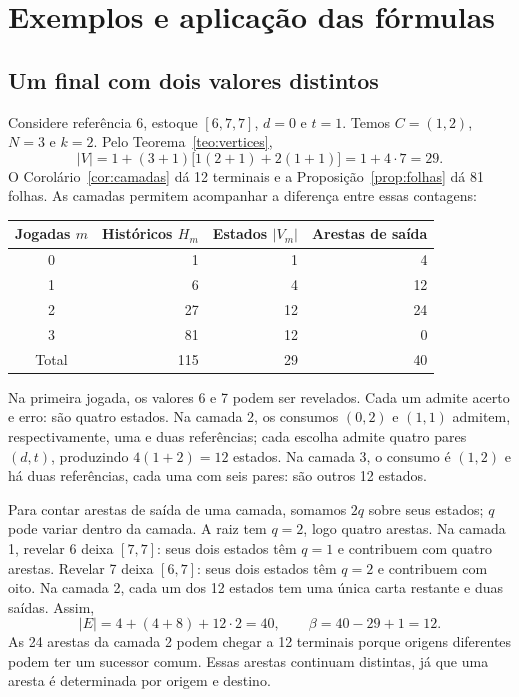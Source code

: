 \documentclass[11pt,a4paper]{article}
\theoremstyle{definition}
\newcommand{\proxpagina}{\newpage}
\begin{document}
\proxpagina
\section{Exemplos e aplicação das fórmulas}
\subsection{Um final com dois valores distintos}
Considere referência 6, estoque $[6,7,7]$, $d=0$ e $t=1$. Temos $C=(1,2)$, $N=3$ e $k=2$. Pelo Teorema~\ref{teo:vertices},
\[
|V|=1+(3+1)\bigl[1(2+1)+2(1+1)\bigr]=1+4\cdot7=29.
\]
O Corolário~\ref{cor:camadas} dá 12 terminais e a Proposição~\ref{prop:folhas} dá 81 folhas. As camadas permitem acompanhar a diferença entre essas contagens:
\begin{center}
\begin{tabular}{@{}crrr@{}}
\toprule
Jogadas $m$ & Históricos $H_m$ & Estados $|V_m|$ & Arestas de saída\\
\midrule
0 & 1 & 1 & 4\\
1 & 6 & 4 & 12\\
2 & 27 & 12 & 24\\
3 & 81 & 12 & 0\\
\midrule
Total & 115 & 29 & 40\\
\bottomrule
\end{tabular}
\end{center}

Na primeira jogada, os valores 6 e 7 podem ser revelados. Cada um admite acerto e erro: são quatro estados. Na camada 2, os consumos $(0,2)$ e $(1,1)$ admitem, respectivamente, uma e duas referências; cada escolha admite quatro pares $(d,t)$, produzindo $4(1+2)=12$ estados. Na camada 3, o consumo é $(1,2)$ e há duas referências, cada uma com seis pares: são outros 12 estados.

Para contar arestas de saída de uma camada, somamos $2q$ sobre seus estados; $q$ pode variar dentro da camada. A raiz tem $q=2$, logo quatro arestas. Na camada 1, revelar 6 deixa $[7,7]$: seus dois estados têm $q=1$ e contribuem com quatro arestas. Revelar 7 deixa $[6,7]$: seus dois estados têm $q=2$ e contribuem com oito. Na camada 2, cada um dos 12 estados tem uma única carta restante e duas saídas. Assim,
\[
|E|=4+(4+8)+12\cdot2=40,\qquad \beta=40-29+1=12.
\]
As 24 arestas da camada 2 podem chegar a 12 terminais porque origens diferentes podem ter um sucessor comum. Essas arestas continuam distintas, já que uma aresta é determinada por origem e destino.
\end{document}
